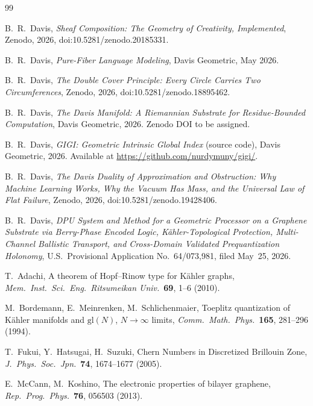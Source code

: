 \documentclass[11pt,letterpaper]{article}
\begin{document}
\begin{thebibliography}{99}

B.~R.\ Davis,
\emph{Sheaf Composition: The Geometry of Creativity, Implemented},
Zenodo, 2026, doi:10.5281/zenodo.20185331.

B.~R.\ Davis,
\emph{Pure-Fiber Language Modeling},
Davis Geometric, May 2026.

B.~R.\ Davis,
\emph{The Double Cover Principle: Every Circle Carries Two
Circumferences},
Zenodo, 2026, doi:10.5281/zenodo.18895462.

B.~R.\ Davis,
\emph{The Davis Manifold: A Riemannian Substrate for Residue-Bounded
Computation},
Davis Geometric, 2026. Zenodo DOI to be assigned.

B.~R.\ Davis,
\emph{GIGI: Geometric Intrinsic Global Index} (source code),
Davis Geometric, 2026.
Available at \url{https://github.com/nurdymuny/gigi/}.

B.~R.\ Davis,
\emph{The Davis Duality of Approximation and Obstruction: Why
Machine Learning Works, Why the Vacuum Has Mass, and the Universal
Law of Flat Failure},
Zenodo, 2026, doi:10.5281/zenodo.19428406.

B.~R.\ Davis,
\emph{DPU System and Method for a Geometric Processor on a Graphene
Substrate via Berry-Phase Encoded Logic, K\"ahler-Topological
Protection, Multi-Channel Ballistic Transport, and Cross-Domain
Validated Prequantization Holonomy},
U.S.\ Provisional Application No.~64/073,981, filed May~25, 2026.

T.~Adachi,
A theorem of Hopf--Rinow type for K\"ahler graphs,
\emph{Mem.\ Inst.\ Sci.\ Eng.\ Ritsumeikan Univ.}\ \textbf{69},
1--6 (2010).

M.~Bordemann, E.~Meinrenken, M.~Schlichenmaier,
Toeplitz quantization of K\"ahler manifolds and $\mathrm{gl}(N)$,
$N \to \infty$ limits,
\emph{Comm.\ Math.\ Phys.}\ \textbf{165}, 281--296 (1994).

T.~Fukui, Y.~Hatsugai, H.~Suzuki,
Chern Numbers in Discretized Brillouin Zone,
\emph{J.\ Phys.\ Soc.\ Jpn.}\ \textbf{74}, 1674--1677 (2005).

E.~McCann, M.~Koshino,
The electronic properties of bilayer graphene,
\emph{Rep.\ Prog.\ Phys.}\ \textbf{76}, 056503 (2013).


\end{thebibliography}
\end{document}
